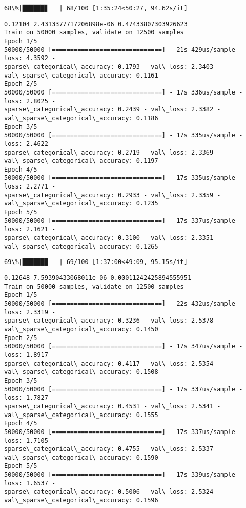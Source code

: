 \documentclass[11pt]{article}
\begin{document}
    \begin{Verbatim}[commandchars=\\\{\}]
 68\%|██████▊   | 68/100 [1:35:24<50:27, 94.62s/it]
    \end{Verbatim}

    \begin{Verbatim}[commandchars=\\\{\}]
0.12104 2.4313377717206898e-06 0.47433807303926623
Train on 50000 samples, validate on 12500 samples
Epoch 1/5
50000/50000 [==============================] - 21s 429us/sample - loss: 4.3592 -
sparse\_categorical\_accuracy: 0.1793 - val\_loss: 2.3403 -
val\_sparse\_categorical\_accuracy: 0.1161
Epoch 2/5
50000/50000 [==============================] - 17s 336us/sample - loss: 2.8025 -
sparse\_categorical\_accuracy: 0.2439 - val\_loss: 2.3382 -
val\_sparse\_categorical\_accuracy: 0.1186
Epoch 3/5
50000/50000 [==============================] - 17s 335us/sample - loss: 2.4622 -
sparse\_categorical\_accuracy: 0.2719 - val\_loss: 2.3369 -
val\_sparse\_categorical\_accuracy: 0.1197
Epoch 4/5
50000/50000 [==============================] - 17s 335us/sample - loss: 2.2771 -
sparse\_categorical\_accuracy: 0.2933 - val\_loss: 2.3359 -
val\_sparse\_categorical\_accuracy: 0.1235
Epoch 5/5
50000/50000 [==============================] - 17s 337us/sample - loss: 2.1621 -
sparse\_categorical\_accuracy: 0.3100 - val\_loss: 2.3351 -
val\_sparse\_categorical\_accuracy: 0.1265
    \end{Verbatim}

    \begin{Verbatim}[commandchars=\\\{\}]
 69\%|██████▉   | 69/100 [1:37:00<49:09, 95.15s/it]
    \end{Verbatim}

    \begin{Verbatim}[commandchars=\\\{\}]
0.12648 7.59390433068011e-06 0.00011242425894555951
Train on 50000 samples, validate on 12500 samples
Epoch 1/5
50000/50000 [==============================] - 22s 432us/sample - loss: 2.3319 -
sparse\_categorical\_accuracy: 0.3236 - val\_loss: 2.5378 -
val\_sparse\_categorical\_accuracy: 0.1450
Epoch 2/5
50000/50000 [==============================] - 17s 347us/sample - loss: 1.8917 -
sparse\_categorical\_accuracy: 0.4117 - val\_loss: 2.5354 -
val\_sparse\_categorical\_accuracy: 0.1508
Epoch 3/5
50000/50000 [==============================] - 17s 337us/sample - loss: 1.7827 -
sparse\_categorical\_accuracy: 0.4531 - val\_loss: 2.5341 -
val\_sparse\_categorical\_accuracy: 0.1555
Epoch 4/5
50000/50000 [==============================] - 17s 337us/sample - loss: 1.7105 -
sparse\_categorical\_accuracy: 0.4755 - val\_loss: 2.5337 -
val\_sparse\_categorical\_accuracy: 0.1590
Epoch 5/5
50000/50000 [==============================] - 17s 339us/sample - loss: 1.6537 -
sparse\_categorical\_accuracy: 0.5006 - val\_loss: 2.5324 -
val\_sparse\_categorical\_accuracy: 0.1596
    \end{Verbatim}
\end{document}

